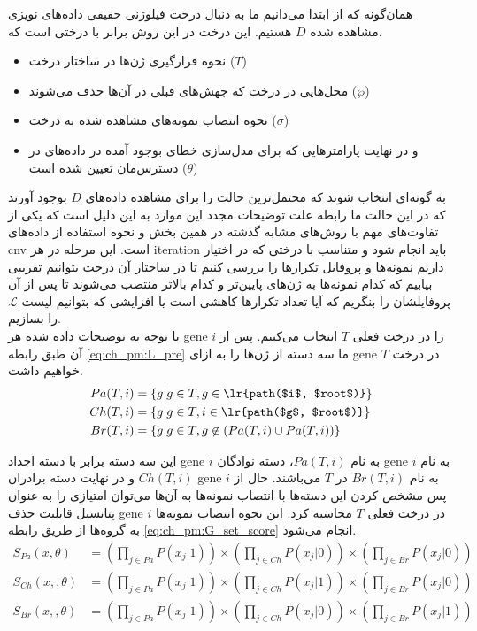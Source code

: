 همان‌گونه که از ابتدا می‌دانیم ما به دنبال درخت فیلوژنی حقیقی داده‌های نویزی مشاهده شده $D$ هستیم. این درخت در این روش برابر با درختی است که،
\begin{itemize}
	\item نحوه قرارگیری ژن‌ها در ساختار درخت ($T$)
	\item محل‌هایی در درخت که جهش‌های قبلی در آن‌ها حذف می‌شوند ($\wp$)
	\item نحوه انتصاب نمونه‌های مشاهده شده به درخت ($\sigma$)
	\item و در نهایت پارامترهایی که برای مدل‌سازی خطای بوجود آمده در داده‌های در دسترس‌مان تعیین شده است ($\theta$)
\end{itemize}
به گونه‌ای انتخاب شوند که محتمل‌ترین حالت را برای مشاهده داده‌های $D$ بوجود آورند که در این حالت ما رابطه 
علت توضیحات مجدد این موارد به این دلیل است که یکی از تفاوت‌های مهم با روش‌های مشابه گذشته در همین بخش و نحوه استفاده از داده‌های \gls{cnv} است. این مرحله در هر \gls{iteration} باید انجام شود و متناسب با درختی که در اختیار داریم نمونه‌ها و پروفایل تکرارها را بررسی کنیم تا در ساختار آن درخت بتوانیم تقریبی بیابیم که کدام نمونه‌ها به ژن‌های پایین‌تر و کدام بالاتر منتصب می‌شوند تا پس از آن پروفایلشان را بنگریم که آیا تعداد تکرارها کاهشی است یا افزایشی که بتوانیم لیست $\mathcal{L}$ را بسازیم.
\\
با توجه به توضیحات داده شده هر \gls{gene} $i$ را در درخت فعلی $T$ انتخاب می‌کنیم. پس از آن طبق رابطه \ref{eq:ch_pm:L_pre} ما سه دسته از ژن‌ها را به ازای \gls{gene} در درخت $T$ خواهیم داشت.
\begin{equation}
	\begin{aligned}
		Pa(T, i) &= \{g| g \in T, g \in \text{\lr{path($i$, $root$)}}\}\\
		Ch(T, i) &=\{g| g \in T, i\in \text{\lr{path($g$, $root$)}}\}\\
		Br(T, i) &= \{g| g \in T, g \not\in (Pa(T, i) \cup Pa(T, i))\}
	\end{aligned}
	\label{eq:ch_pm:L_pre}
\end{equation}

این سه دسته برابر با دسته اجداد \gls{gene} $i$ به نام $Pa(T, i)$، دسته نوادگان \gls{gene} $i$ به نام $Ch(T, i)$ و در نهایت دسته برادران \gls{gene} $i$ به نام $Br(T, i)$ در $T$ می‌باشند.
حال از پس مشخص کردن این دسته‌ها با انتصاب نمونه‌ها به آن‌ها می‌توان امتیازی را به عنوان پتانسیل قابلیت حذف \gls{gene} $i$ در درخت فعلی $T$ محاسبه کرد.
این نحوه انتصاب نمونه‌ها به گروه‌ها از طریق رابطه \ref{eq:ch_pm:G_set_score} انجام می‌شود.
\begin{equation}
	\begin{aligned}
		S_{Pa}(x, \theta) &= \left(\prod_{j\in Pa}P(x_j|1)\right) \times\left(\prod_{j\in Ch}P(x_j|0)\right) \times\left(\prod_{j\in Br}P(x_j|0)\right)\\
		S_{Ch}(x,, \theta) &=\left(\prod_{j\in Pa}P(x_j|1)\right) \times\left(\prod_{j\in Ch}P(x_j|1)\right) \times\left(\prod_{j\in Br}P(x_j|0)\right)\\
		S_{Br}(x,, \theta) &= \left(\prod_{j\in Pa}P(x_j|1)\right) \times\left(\prod_{j\in Ch}P(x_j|0)\right) \times\left(\prod_{j\in Br}P(x_j|1)\right)
	\end{aligned}
	\label{eq:ch_pm:G_set_score}
\end{equation}

